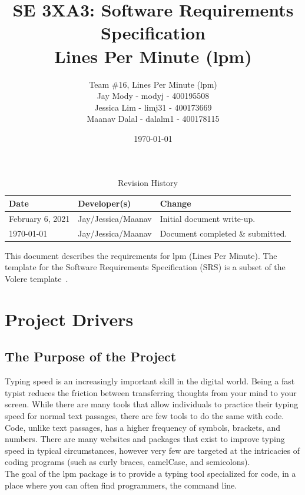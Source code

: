 \documentclass[12pt, titlepage]{article}
\title{\textbf{SE 3XA3: Software Requirements Specification}\\Lines Per Minute (lpm)}
\author{Team \#16, Lines Per Minute (lpm)\\
Jay Mody - modyj - 400195508\\
Jessica Lim - limj31 - 400173669\\
Maanav Dalal - dalalm1 - 400178115\\
}
\date{\today}
\begin{document}
\maketitle
\begin{table}[hp]
\caption{Revision History} \label{TblRevisionHistory}
\begin{tabularx}{\textwidth}{llX}
\toprule
\textbf{Date} & \textbf{Developer(s)} & \textbf{Change}\\
\midrule
February 6, 2021 & Jay/Jessica/Maanav & Initial document write-up. \\
\today & Jay/Jessica/Maanav & Document completed \& submitted. \\
\bottomrule
\end{tabularx}
\end{table}

\newpage

\tableofcontents
\listoftables
\listoffigures



\newpage


This document describes the requirements for lpm (Lines Per Minute).  The template for the Software
Requirements Specification (SRS) is a subset of the Volere
template~\citep{RobertsonAndRobertson2012}.
\section{Project Drivers}

\subsection{The Purpose of the Project}
Typing speed is an increasingly important skill in the digital world. Being a fast typist reduces the friction between transferring thoughts from your mind to your screen. While there are many tools that allow individuals to practice their typing speed for normal text passages, there are few tools to do the same with code. Code, unlike text passages, has a higher frequency of symbols, brackets, and numbers. There are many websites and packages that exist to improve typing speed in typical circumstances, however very few are targeted at the intricacies of coding programs (such as curly braces, camelCase, and semicolons). \\

The goal of the lpm package is to provide a typing tool specialized for code, in a place where you can often find programmers, the command line.
\end{document}
